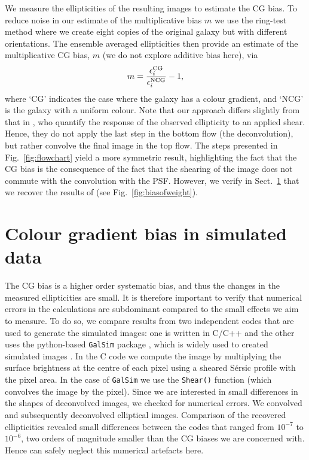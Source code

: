 \documentclass[useAMS,usenatbib]{mnras}
\newcommand{\be}{\begin{equation}}
\newcommand{\ee}{\end{equation}}
\begin{document}
We measure the ellipticities of the resulting images to estimate the CG bias. To reduce noise in our estimate of the multiplicative bias $m$ we use the ring-test method \citep{Nakajima07} where we create eight copies of the original galaxy but with different orientations. The ensemble averaged ellipticities then  provide an estimate of the multiplicative CG bias, $m$ (we do not explore additive bias here), via
%
\be
m= {\epsilon_i^{\rm CG} \over \epsilon_i^{\rm NCG} }-1,
\ee
%
where `CG' indicates the case where the galaxy has a colour gradient, and `NCG' is the galaxy
with a uniform colour. Note that our approach differs slightly from that in , who quantify the
response of the observed ellipticity to an applied shear. Hence, they do not apply the last step
in the bottom flow (the deconvolution), but rather convolve the final image in the top flow. 
The steps presented in Fig.~\ref{fig:flowchart} yield a more symmetric result, highlighting the fact
that the CG bias is the consequence of the fact that the shearing of the image does not commute with the convolution with the PSF. However, we verify in Sect.~\ref{sec:simulations} that we recover
the results of  (see Fig.~\ref{fig:biasofweight}).

\section{Colour gradient bias in simulated data}
\label{sec:simulations}

The CG bias is a higher order systematic bias, and thus the changes in
the measured ellipticities are small. It is therefore important to
verify that numerical errors in the calculations are subdominant
compared to the small effects we aim to measure. To do so, we compare
results from two independent codes that are used to generate the
simulated images: one is written in C/C++ and the other uses the
python-based {\tt GalSim} package \citep{Rowe15}, which is widely used
to created simulated images \citep[e.g.][]{FenechConti17,
  Hoekstra16}. In the C code we compute the image by multiplying the
surface brightness at the centre of each pixel using a sheared
S{\'e}rsic profile with the pixel area. In the case of {\tt GalSim} we
use the {\tt Shear()} function (which convolves the image by the
pixel). Since we are interested in small differences in the shapes of
deconvolved images, we checked for numerical errors. We convolved and
subsequently deconvolved elliptical images. Comparison of the
recovered ellipticities revealed small differences between the codes
that ranged from $10^{-7}$ to $10^{-6}$, two orders of magnitude
smaller than the CG biases we are concerned with. Hence can safely
neglect this numerical artefacts here.
\end{document}
